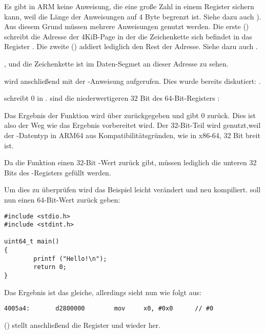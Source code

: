 Es gibt in ARM keine Anweisung, die eine große Zahl in einem Register sichern kann, weil die Länge der
Anweisungen auf 4 Byte begrenzt ist. Siehe dazu auch ).
Aus diesem Grund müssen mehrere Anweisungen genutzt werden. Die erste () schreibt die Adresse
der 4KiB-Page in der die Zeichenkette sich befindet in das Register .
Die zweite (\ADD) addiert lediglich den Rest der Adresse.
Siehe dazu auch .

, und die Zeichenkette  ist im  Daten-Segmet
an dieser Adresse zu sehen.


\puts wird anschließend mit der -Anweisung aufgerufen. Dies wurde bereits diskutiert: .

\MOV schreibt 0 in .
 sind die niederwertigeren 32 Bit des 64-Bit-Registers :



Das Ergebnis der Funktion wird über  zurückgegeben und \main gibt 0 zurück.
Dies ist also der Weg wie das Ergebnis vorbereitet wird.
Der 32-Bit-Teil wird genutzt,weil der \Tint-Datentyp in ARM64 aus Kompatibilitätsgründen,
wie in x86-64, 32 Bit breit ist.

Da die Funktion einen 32-Bit \Tint-Wert zurück gibt, müssen lediglich die unteren 32 Bits des
-Registers gefüllt werden.

Um dies zu überprüfen wird das Beispiel leicht verändert und neu kompiliert.
\main soll nun einen 64-Bit-Wert zurück geben:

\begin{lstlisting}[caption=\main gibt einen \TT{uint64\_t}-Datentyp zurück]
#include <stdio.h>
#include <stdint.h>

uint64_t main()
{
        printf ("Hello!\n");
        return 0;
}
\end{lstlisting}

Das Ergebnis ist das gleiche, allerdings sieht \MOV nun wie folgt aus:

\begin{lstlisting}[caption=\NonOptimizing GCC 4.8.1 + objdump]
  4005a4:       d2800000        mov     x0, #0x0      // #0
\end{lstlisting}


 () stellt anschließend die Register  und  wieder her.

